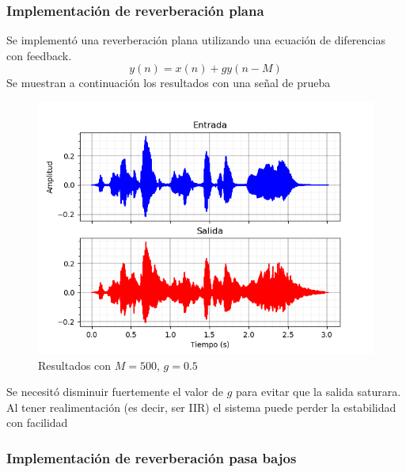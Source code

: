 \documentclass[assd_tp2_main.tex]{subfiles}
\begin{document}
\subsubsection{Implementación de reverberación plana}
Se implementó una reverberación plana utilizando una ecuación de diferencias con feedback. 
\begin{equation}
	y(n)=x(n)+gy(n-M)
\end{equation}
Se muestran a continuación los resultados con una señal de prueba
\begin{figure}[H]	
	\centering
	\includegraphics[scale=1]{graficos/EJ8/eco_plano.png}
	\caption{Resultados con $M=500$, $g=0.5$ }
	\label{fig:bloqueElemental}
\end{figure}
Se necesitó disminuir fuertemente el valor de $g$ para evitar que la salida saturara. Al tener realimentación (es decir, ser IIR) el sistema puede perder la estabilidad con facilidad

\subsubsection{Implementación de reverberación pasa bajos}
\end{document}
